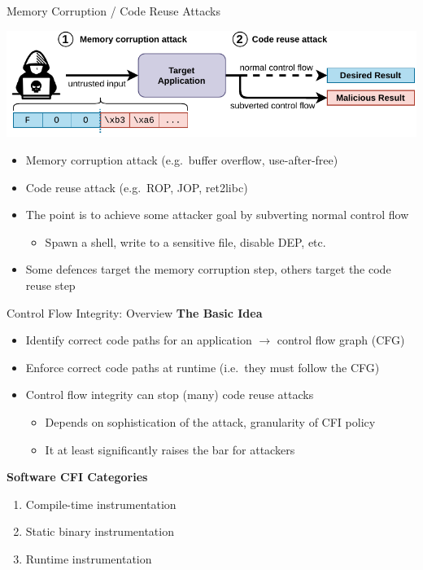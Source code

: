 \documentclass[12pt, dvipsnames, aspectratio=169]{beamer}
\begin{document}
\begin{frame}[c]{Memory Corruption / Code Reuse Attacks}{}
\begin{center}
  \color{black}%
  \includegraphics[width=0.8\columnwidth]{figs/memory_corruption.pdf}
\end{center}

\vfill
\begin{itemize}
  \item Memory corruption attack (e.g.~buffer overflow, use-after-free)
  \item Code reuse attack (e.g.~ROP, JOP, ret2libc)
  \item The point is to achieve some attacker goal by subverting normal control flow
  \begin{itemize}
    \item Spawn a shell, write to a sensitive file, disable DEP, etc.
  \end{itemize}
  \item Some defences target the memory corruption step, others target the code reuse step
\end{itemize}
\end{frame}

\begin{frame}[c]{Control Flow Integrity: Overview}{}
{\bf The Basic Idea}
\begin{itemize}
  \item Identify correct code paths for an application $\rightarrow$ control flow graph (CFG)
  \item Enforce correct code paths at runtime (i.e.~they must follow the CFG)
  \item Control flow integrity can stop (many) code reuse attacks
  \begin{itemize}
    \item Depends on sophistication of the attack, granularity of CFI policy
    \item It at least significantly raises the bar for attackers
  \end{itemize}
\end{itemize}

\vfill
{\bf Software CFI Categories}
\begin{enumerate}
  \item Compile-time instrumentation
  \item Static binary instrumentation
  \item Runtime instrumentation
\end{enumerate}
\end{frame}
\end{document}
